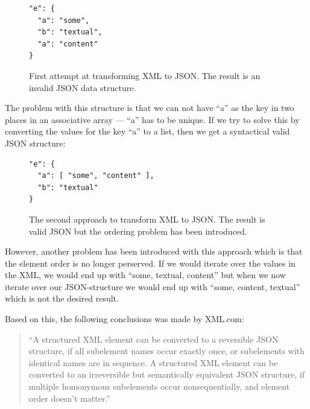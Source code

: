 \documentclass{cslthse-msc}
\begin{document}
\begin{figure}[H]
  \centering
    \begin{center}
\begin{lstlisting}[breaklines=true,frame=single]
"e": {
  "a": "some",
  "b": "textual",
  "a": "content"
}
\end{lstlisting}
    \end{center}
  \caption{First attempt at transforming XML to JSON. The result is an invalid JSON data structure.}
\end{figure}

The problem with this structure is that we can not have \enquote{a} as the key in two places in an associative array --- \enquote{a} has to be unique. If we try to solve this by converting the values for the key \enquote{a} to a list, then we get a syntactical valid JSON structure:

\begin{figure}[H]
  \centering
    \begin{center}
\begin{lstlisting}[breaklines=true,frame=single]
"e": {
  "a": [ "some", "content" ],
  "b": "textual"
}
\end{lstlisting}
    \end{center}
  \caption{The second approach to transform XML to JSON. The result is valid JSON but the ordering problem has been introduced.}
\end{figure}

However, another problem has been introduced with this approach which is that the element order is no longer perserved. If we would iterate over the values in the XML, we would end up with \enquote{some, textual, content} but when we now iterate over our JSON-structure we would end up with \enquote{some, content, textual} which is not the desired result.

Based on this, the following conclusions was made by XML.com:

\begin{quote}

\enquote{A structured XML element can be converted to a reversible JSON structure, if all subelement names occur exactly once, or subelements with identical names are in sequence. A structured XML element can be converted to an irreversible but semantically equivalent JSON structure, if multiple homonymous subelements occur nonsequentially, and element order doesn't matter.} \cite{xml_json}

\end{quote}
\end{document}

